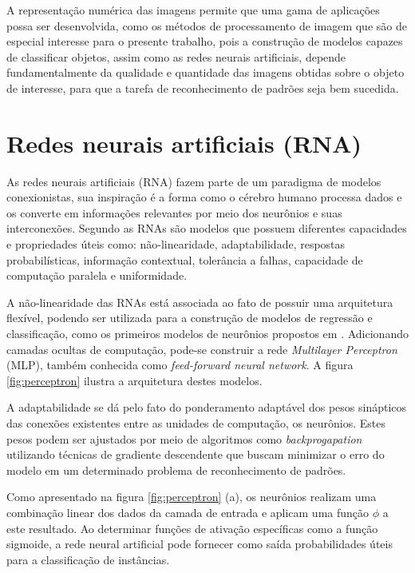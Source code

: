 A representação numérica das imagens permite que uma gama de aplicações possa ser desenvolvida, como os métodos de processamento de imagem que são de especial interesse para o presente trabalho, pois a construção de modelos capazes de classificar objetos, assim como as redes neurais artificiais, depende fundamentalmente da qualidade e quantidade das imagens obtidas sobre o objeto de interesse, para que a tarefa de reconhecimento de padrões seja bem sucedida.




\section{Redes neurais artificiais (RNA)}

As redes neurais artificiais (RNA) fazem parte de um paradigma de modelos conexionistas, sua inspiração é a forma como o cérebro humano processa dados e os converte em informações relevantes por meio dos neurônios e suas interconexões. Segundo  as RNAs são modelos que possuem diferentes capacidades e propriedades úteis como: não-linearidade, adaptabilidade, respostas probabilísticas, informação contextual, tolerância a falhas, capacidade de computação paralela e uniformidade.

A não-linearidade das RNAs está associada ao fato de possuir uma arquitetura flexível, podendo ser utilizada para a construção de modelos de regressão e classificação, como os primeiros modelos de neurônios propostos em . Adicionando camadas ocultas de computação, pode-se construir a rede \textit{Multilayer Perceptron} (MLP), também conhecida como \textit{feed-forward neural network}. A figura \ref{fig:perceptron} ilustra a arquitetura destes modelos.

A adaptabilidade se dá pelo fato do ponderamento adaptável dos pesos sinápticos das conexões existentes entre as unidades de computação, os neurônios. Estes pesos podem ser ajustados por meio de algoritmos como \textit{backprogapation} utilizando técnicas de gradiente descendente que buscam minimizar o erro do modelo em um determinado problema de reconhecimento de padrões.

Como apresentado na figura \ref{fig:perceptron} (a), os neurônios realizam uma combinação linear dos dados da camada de entrada e aplicam uma função $\phi$ a este resultado. Ao determinar funções de ativação específicas como a função sigmoide, a rede neural artificial pode fornecer como saída probabilidades úteis para a classificação de instâncias.

